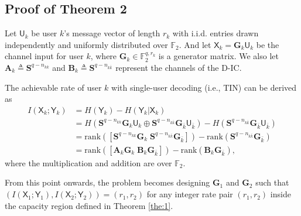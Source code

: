 \documentclass[12pt, draftclsnofoot, onecolumn]{IEEEtran}
\newcommand{\msf}[1]{\mathsf{#1}}
\theoremstyle{definition}
\begin{document}
\subsection{Proof of Theorem 2}\label{sec:2c}
Let $\msf{U}_k$ be user $k$'s message vector of length $r_k$ with i.i.d. entries drawn independently and uniformly distributed over $\mathbb{F}_2$. And let $\msf{X}_k = \boldsymbol{G}_k \msf{U}_k$ be the channel input for user $k$, where $\boldsymbol{G}_k \in \mathbb{F}_2^{q,r_k}$ is a generator matrix. We also let $\boldsymbol{A}_k \triangleq \boldsymbol{S}^{q-n_{kk}}$ and $\boldsymbol{B}_k \triangleq \boldsymbol{S}^{q-n_{k\bar{k}}}$ represent the channels of the D-IC.



The achievable rate of user $k$ with single-user decoding (i.e., TIN) can be derived as
\begin{align}
I(\msf{X}_k;\msf{Y}_k) &= H(\msf{Y}_k) - H(\msf{Y}_k|\msf{X}_k) \nonumber \\
& = H(\boldsymbol{S}^{q-n_{kk}}\boldsymbol{G}_k \msf{U}_k\oplus \boldsymbol{S}^{q-n_{k\bar{k}}}\boldsymbol{G}_{\bar{k}} \msf{U}_{\bar{k}}) - H(\boldsymbol{S}^{q-n_{k\bar{k}}}\boldsymbol{G}_{\bar{k}} \msf{U}_{\bar{k}}) \nonumber  \\
& = \text{rank}([\boldsymbol{S}^{q-n_{kk}}\boldsymbol{G}_k \; \boldsymbol{S}^{q-n_{k\bar{k}}}\boldsymbol{G}_{\bar{k}}]) - \text{rank}(\boldsymbol{S}^{q-n_{k\bar{k}}}\boldsymbol{G}_{\bar{k}}) \nonumber  \\
& = \text{rank}([\boldsymbol{A}_k\boldsymbol{G}_k \; \boldsymbol{B}_k\boldsymbol{G}_{\bar{k}}]) - \text{rank}(\boldsymbol{B}_k\boldsymbol{G}_{\bar{k}}), \label{eq:I1}
\end{align}
where the multiplication and addition are over $\mathbb{F}_2$.


From this point onwards, the problem becomes designing $\boldsymbol{G}_1$ and $\boldsymbol{G}_2$ such that \\ $(I(\msf{X}_1;\msf{Y}_1),I(\msf{X}_2;\msf{Y}_2))=(r_1,r_2)$ for any integer rate pair $(r_1,r_2)$ inside the capacity region defined in Theorem \ref{the:1}.
\end{document}
